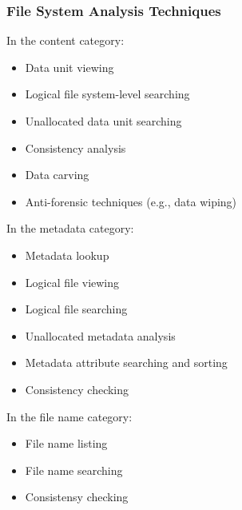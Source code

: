 \documentclass[10pt,a4paper]{report}
\begin{document}
\subsubsection{File System Analysis Techniques}
In the content category:
\begin{itemize}
\item Data unit viewing
\item Logical file system-level searching
\item Unallocated data unit searching
\item Consistency analysis
\item Data carving
\item Anti-forensic techniques (e.g., data wiping)
\end{itemize}
In the metadata category:
\begin{itemize}
\item Metadata lookup
\item Logical file viewing
\item Logical file searching
\item Unallocated metadata analysis
\item Metadata attribute searching and sorting
\item Consistency checking
\end{itemize}
In the file name category:
\begin{itemize}
\item File name listing
\item File name searching
\item Consistensy checking
\end{itemize}
\end{document}

